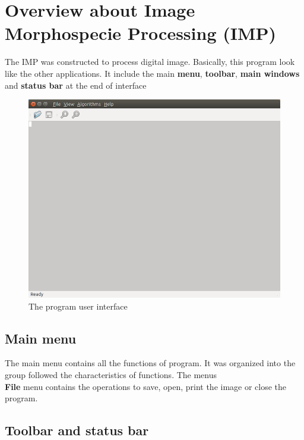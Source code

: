 \section{Overview about Image Morphospecie Processing (IMP)}
The IMP was constructed to process digital image. Basically, this program look like the other applications. It include the main \textbf{menu}, \textbf{toolbar}, \textbf{main windows} and \textbf{status bar} at the end of interface
\begin{figure}[h!]
\centering
\includegraphics[scale=0.4]{images/main}
\caption{The program user interface}
\label{fig:figure_31}
\end{figure}
\subsection{Main menu}
The main menu contains all the functions of program. It was organized into the group followed the characteristics of functions. The menus \\
\textbf{File} menu contains the operations to save, open, print the image or close the program.
\subsection{Toolbar and status bar}